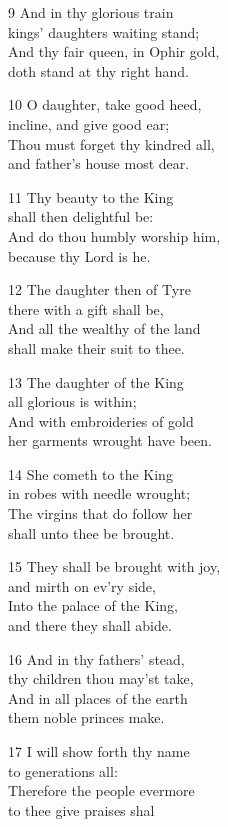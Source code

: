 \begin{multicols}{3}
9 And in thy glorious train\\
kings’ daughters waiting stand;\\
And thy fair queen, in Ophir gold,\\
doth stand at thy right hand.

10 O daughter, take good heed,\\
incline, and give good ear;\\
Thou must forget thy kindred all,\\
and father’s house most dear.

11 Thy beauty to the King\\
shall then delightful be:\\
And do thou humbly worship him,\\
because thy Lord is he.

12 The daughter then of Tyre\\
there with a gift shall be,\\
And all the wealthy of the land\\
shall make their suit to thee.

13 The daughter of the King\\
all glorious is within;\\
And with embroideries of gold\\
her garments wrought have been.

14 She cometh to the King\\
in robes with needle wrought;\\
The virgins that do follow her\\
shall unto thee be brought.

15 They shall be brought with joy,\\
and mirth on ev’ry side,\\
Into the palace of the King,\\
and there they shall abide.

16 And in thy fathers’ stead,\\
thy children thou may’st take,\\
And in all places of the earth\\
them noble princes make.

17 I will show forth thy name\\
to generations all:\\
Therefore the people evermore\\
to thee give praises shal

\begin{center}
\quad{}\quad{}
\end{center}


\end{multicols}
